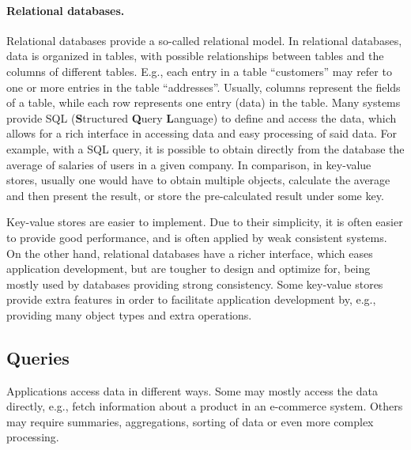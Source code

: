 \paragraph{Relational databases.}
Relational databases provide a so-called relational model.
In relational databases, data is organized in tables, with possible relationships between tables and the columns of different tables.
E.g., each entry in a table ``customers'' may refer to one or more entries in the table ``addresses''.
Usually, columns represent the fields of a table, while each row represents one entry (data) in the table.
Many systems provide SQL (\textbf{S}tructured \textbf{Q}uery \textbf{L}anguage) to define and access the data, which allows for a rich interface in accessing data and easy processing of said data.
For example, with a SQL query, it is possible to obtain directly from the database the average of salaries of users in a given company.
In comparison, in key-value stores, usually one would have to obtain multiple objects, calculate the average and then present the result, or store the pre-calculated result under some key.

Key-value stores are easier to implement.
Due to their simplicity, it is often easier to provide good performance, and is often applied by weak consistent systems.
On the other hand, relational databases have a richer interface, which eases application development, but are tougher to design and optimize for, being mostly used by databases providing strong consistency.
Some key-value stores provide extra features in order to facilitate application development by, e.g., providing many object types and extra operations.

\subsection{Queries}


Applications access data in different ways.
Some may mostly access the data directly, e.g., fetch information about a product in an e-commerce system.
Others may require summaries, aggregations, sorting of data or even more complex processing.

